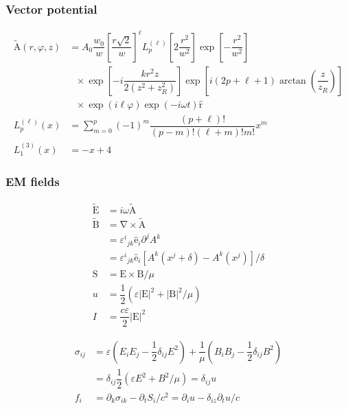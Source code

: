 \documentclass[xcolor=dvipsnames]{beamer}
\newcommand{\f}[2]{\dfrac{#1}{#2}} %
\newcommand{\p}[1]{\left(#1\right)} %
\renewcommand{\sp}[1]{\left[#1\right]} %
\newcommand{\abs}[1]{\left|#1\right|} %
\renewcommand{\epsilon}{\varepsilon} %
\renewcommand{\phi}{\varphi} %
\renewcommand{\v}[1]{\boldsymbol{\mathrm{#1}}} %
\newcommand{\uv}[1]{\hat{\boldsymbol{\mathrm{#1}}}} %
\newcommand{\del}{\v\nabla} %
\renewcommand{\d}{\partial} %
\newcommand{\cxv}[1]{\v{\widetilde{#1}}} %
\begin{document}
\begin{frame}
  \frametitle{Vector potential}
  \begin{align*}
    {\cxv A}\p{r,\phi,z}&=A_0\f{w_0}{w}\sp{\f{r\sqrt 2}{w}}^\ell
    L^{\p{\ell}}_p\sp{2\f{r^2}{w^2}}\exp\sp{-\f{r^2}{w^2}} \\
    &~~~\times\exp\sp{-i\f{kr^2z}{2\p{z^2+z_R^2}}}
    \exp\sp{i\p{2p+\ell+1}\arctan\p{\f z{z_R}}} \\
    &~~~\times\exp\p{i\ell\phi}\exp\p{-i\omega t} \uv r \\
    L^{\p{\ell}}_p\p{x}
    &=\sum_{m=0}^p\p{-1}^m\f{\p{p+\ell}!}{\p{p-m}!\p{\ell+m}!m!}x^m \\
    L^{\p{3}}_1\p{x}&=-x+4
  \end{align*}
\end{frame}

\begin{frame}
  \frametitle{EM fields}
  \begin{align*}
    \cxv E&=i\omega\cxv A \\
    \cxv B&=\del \times\cxv A \\
    &={\varepsilon^i}_{jk}\uv e_i\d^jA^k \\
    &={\varepsilon^i}_{jk}\uv
    e_i\sp{A^k\p{x^j+\delta}-A^k\p{x^j}}/\delta \\
    \v S&=\v E\times\v B/\mu \\
    u&=\f12\p{\epsilon\abs{\v E}^2+\abs{\v B}^2/\mu} \\
    I&=\f{c\epsilon}2\abs{\v E}^2
  \end{align*}
\end{frame}

\begin{frame}
  \begin{align*}
    \sigma_{ij}&=\epsilon\p{E_iE_j-\f12\delta_{ij}E^2}
    +\f1\mu\p{B_iB_j-\f12\delta_{ij}B^2} \\
    &=\delta_{ij}\f12\p{\epsilon
      E^2+B^2/\mu}=\delta_{ij}u \\
    f_i&=\d_k\sigma_{ik}-\d_tS_i/c^2=\d_iu-\delta_{iz}\d_tu/c
  \end{align*}
\end{frame}
\end{document}
